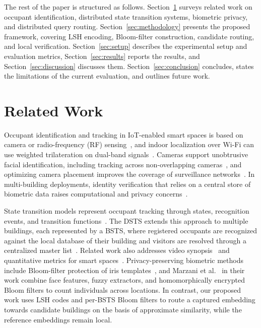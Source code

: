 \documentclass[pdflatex,sn-mathphys-num]{sn-jnl}%
\theoremstyle{thmstyleone}%
\theoremstyle{thmstyletwo}%
\theoremstyle{thmstylethree}%
\begin{document}
The rest of the paper is structured as follows. Section~\ref{sec:related} surveys related work on occupant identification, distributed state transition systems, biometric privacy, and distributed query routing. Section~\ref{sec:methodology} presents the proposed framework, covering LSH encoding, Bloom-filter construction, candidate routing, and local verification. Section~\ref{sec:setup} describes the experimental setup and evaluation metrics, Section~\ref{sec:results} reports the results, and Section~\ref{sec:discussion} discusses them. Section~\ref{sec:conclusion} concludes, states the limitations of the current evaluation, and outlines future work.



\section{Related Work}
\label{sec:related}

Occupant identification and tracking in IoT-enabled smart spaces is based on camera or radio-frequency (RF) sensing~\cite{mohan2020,WZSYGWLLHSC2025}, and indoor localization over Wi-Fi can use weighted trilateration on dual-band signals~\cite{MSSAB2019}. Cameras support unobtrusive facial identification, including tracking across non-overlapping cameras~\cite{nair2021}, and optimizing camera placement improves the coverage of surveillance networks~\cite{SM2022}. In multi-building deployments, identity verification that relies on a central store of biometric data raises computational and privacy concerns~\cite{mohan2020}.

State transition models represent occupant tracking through states, recognition events, and transition functions~\cite{MJG2011}. The DSTS extends this approach to multiple buildings, each represented by a BSTS, where registered occupants are recognized against the local database of their building and visitors are resolved through a centralized master list~\cite{mohan2020}. Related work also addresses video synopsis~\cite{NGA2022} and quantitative metrics for smart spaces~\cite{MMJ2025}. Privacy-preserving biometric methods include Bloom-filter protection of iris templates~\cite{rathgeb2014}, and Marzani et al.~\cite{marzani2026} in their work combine face features, fuzzy extractors, and homomorphically encrypted Bloom filters to count individuals across locations. In contrast, our proposed work uses LSH codes and per-BSTS Bloom filters to route a captured embedding towards candidate buildings on the basis of approximate similarity, while the reference embeddings remain local.
\end{document}
